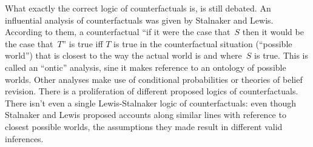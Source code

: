 \documentclass[../../../include/open-logic-section]{subfiles}
\begin{document}
What exactly the correct logic of counterfactuals is, is still
debated. An influential analysis of counterfactuals was given by
Stalnaker and Lewis.  According to them, a counterfactual ``if it were
the case that~$S$ then it would be the case that~$T$'' is true iff $T$
is true in the counterfactual situation (``possible world'') that is
closest to the way the actual world is and where~$S$ is true. This is
called an ``ontic'' analysis, sine it makes reference to an ontology
of possible worlds. Other analyses make use of conditional
probabilities or theories of belief revision.  There is a
proliferation of different proposed logics of counterfactuals. There
isn't even a single Lewis-Stalnaker logic of counterfactuals: even
though Stalnaker and Lewis proposed accounts along similar lines with
reference to closest possible worlds, the assumptions they made result
in different valid inferences.
\end{document}
